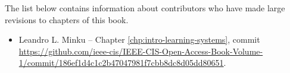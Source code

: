 
\contributors

The list below contains information about contributors who have made large revisions to chapters of this book.

\begin{itemize}
\item Leandro L. Minku -- Chapter \ref{chp:intro-learning-systems}, commit \url{https://github.com/ieee-cis/IEEE-CIS-Open-Access-Book-Volume-1/commit/186ef1d4c1c2b47047981f7cbb8dc8d05dd80651}.
\end{itemize}
